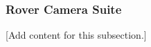 
\subsubsection{Rover Camera Suite}
\label{subsubsec:design_2_4_3_rover_camera_suite}

[Add content for this subsection.]
